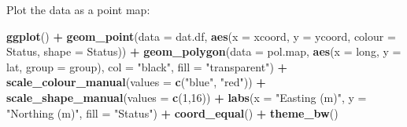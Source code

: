 \documentclass[
]{article}
\newenvironment{Shaded}{\begin{snugshade}}{\end{snugshade}}
\newcommand{\CommentTok}[1]{\textcolor[rgb]{0.56,0.35,0.01}{\textit{#1}}}
\newcommand{\DataTypeTok}[1]{\textcolor[rgb]{0.13,0.29,0.53}{#1}}
\newcommand{\DecValTok}[1]{\textcolor[rgb]{0.00,0.00,0.81}{#1}}
\newcommand{\KeywordTok}[1]{\textcolor[rgb]{0.13,0.29,0.53}{\textbf{#1}}}
\newcommand{\NormalTok}[1]{#1}
\newcommand{\OperatorTok}[1]{\textcolor[rgb]{0.81,0.36,0.00}{\textbf{#1}}}
\newcommand{\OtherTok}[1]{\textcolor[rgb]{0.56,0.35,0.01}{#1}}
\newcommand{\StringTok}[1]{\textcolor[rgb]{0.31,0.60,0.02}{#1}}
\begin{document}
\begin{Shaded}
\end{Shaded}

Plot the data as a point map:

\begin{Shaded}
\begin{Highlighting}[]

\KeywordTok{ggplot}\NormalTok{() }\OperatorTok{+}
\StringTok{  }\KeywordTok{geom\_point}\NormalTok{(}\DataTypeTok{data =}\NormalTok{ dat.df, }\KeywordTok{aes}\NormalTok{(}\DataTypeTok{x =}\NormalTok{ xcoord, }\DataTypeTok{y =}\NormalTok{ ycoord, }\DataTypeTok{colour =}\NormalTok{ Status, }\DataTypeTok{shape =}\NormalTok{ Status)) }\OperatorTok{+}
\StringTok{  }\KeywordTok{geom\_polygon}\NormalTok{(}\DataTypeTok{data =}\NormalTok{ pol.map, }\KeywordTok{aes}\NormalTok{(}\DataTypeTok{x =}\NormalTok{ long, }\DataTypeTok{y =}\NormalTok{ lat, }\DataTypeTok{group =}\NormalTok{ group), }\DataTypeTok{col =} \StringTok{"black"}\NormalTok{, }
     \DataTypeTok{fill =} \StringTok{"transparent"}\NormalTok{) }\OperatorTok{+}\StringTok{ }
\StringTok{  }\KeywordTok{scale\_colour\_manual}\NormalTok{(}\DataTypeTok{values =} \KeywordTok{c}\NormalTok{(}\StringTok{"blue"}\NormalTok{, }\StringTok{"red"}\NormalTok{)) }\OperatorTok{+}
\StringTok{  }\KeywordTok{scale\_shape\_manual}\NormalTok{(}\DataTypeTok{values =} \KeywordTok{c}\NormalTok{(}\DecValTok{1}\NormalTok{,}\DecValTok{16}\NormalTok{)) }\OperatorTok{+}
\StringTok{  }\KeywordTok{labs}\NormalTok{(}\DataTypeTok{x =} \StringTok{"Easting (m)"}\NormalTok{, }\DataTypeTok{y =} \StringTok{"Northing (m)"}\NormalTok{, }\DataTypeTok{fill =} \StringTok{"Status"}\NormalTok{) }\OperatorTok{+}
\StringTok{  }\KeywordTok{coord\_equal}\NormalTok{() }\OperatorTok{+}\StringTok{ }
\StringTok{  }\KeywordTok{theme\_bw}\NormalTok{()}
\end{Highlighting}
\end{Shaded}
\end{document}
